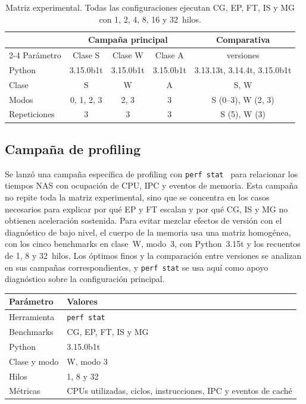 \begin{table}[htbp]
\centering
\begin{tabular}{l|c|c|c|c}
 & \multicolumn{3}{c|}{Campaña principal} & Comparativa \\
\cline{2-4}
Parámetro & Clase S & Clase W & Clase A & versiones \\
\hline
Python & 3.15.0b1t & 3.15.0b1t & 3.15.0b1t & 3.13.13t, 3.14.4t, 3.15.0b1t \\
Clase & S & W & A & S, W \\
Modos & 0, 1, 2, 3 & 2, 3 & 3 & S (0--3), W (2, 3) \\
Repeticiones & 3 & 3 & 3 & S (5), W (3) \\
\end{tabular}
\caption{Matriz experimental. Todas las configuraciones ejecutan CG, EP, FT, IS
y MG con 1, 2, 4, 8, 16 y 32~hilos.}
\label{tab:matriz-experimental}
\end{table}

\subsection{Campaña de profiling}
Se lanzó una campaña específica de profiling con \texttt{perf stat}~\cite{LinuxPerfStat} para
relacionar los tiempos NAS con ocupación de CPU, IPC y eventos de memoria. Esta
campaña no repite toda la matriz experimental, sino que se concentra en los
casos necesarios para explicar por qué EP y FT escalan y por qué CG, IS y MG no
obtienen aceleración sostenida. Para evitar mezclar efectos de versión con el
diagnóstico de bajo nivel, el cuerpo de la memoria usa una matriz homogénea, con
los cinco benchmarks en clase~W, modo~3, con Python~3.15t y los recuentos de
1, 8 y 32~hilos. Los óptimos finos y la comparación entre versiones se analizan
en sus campañas correspondientes, y \texttt{perf stat} se usa aquí como apoyo
diagnóstico sobre la configuración principal.

\begin{center}
\small
\begin{tabular}{l|l}
Parámetro & Valores \\
\hline
Herramienta & \texttt{perf stat} \\
Benchmarks & CG, EP, FT, IS y MG \\
Python & 3.15.0b1t \\
Clase y modo & W, modo 3 \\
Hilos & 1, 8 y 32 \\
Métricas & CPUs utilizadas, ciclos, instrucciones, IPC y eventos de caché \\
\end{tabular}
\end{center}

